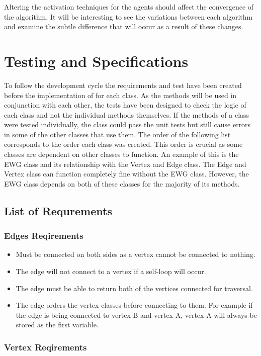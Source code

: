 \documentclass{AISB2008}
\begin{document}
{Altering the activation techniques for the agents should affect the convergence of the algorithm. It will be interesting to see the variations between each algorithm and examine the subtle difference that will occur as a result of these changes.


\section{Testing and Specifications}
To follow the development cycle the requirements and test have been created before the implementation of for each class. As the methods will be used in conjunction with each other, the tests have been designed to check the logic of each class and not the individual methods themselves. If the methods of a class were tested individually, the class could pass the unit tests but still cause errors in some of the other classes that use them.
The order of the following list corresponds to the order each class was created. This order is crucial as some classes are dependent on other classes to function. An example of this is the EWG class and its relationship with the Vertex and Edge class. The Edge and Vertex class can function completely fine without the EWG class. However, the EWG class depends on both of these classes for the majority of its methods.

\subsection{List of Requrements}

\subsubsection{Edges Reqirements}

\begin{itemize}
\item Must be connected on both sides as a vertex cannot be connected to nothing.
\item The edge will not connect to a vertex if a self-loop will occur.
\item The edge must be able to return both of the vertices connected for traversal.
\item The edge orders the vertex classes before connecting to them. For example if the edge is being connected to vertex B and vertex A, vertex A will always be stored as the first variable.
\end{itemize}


\subsubsection{Vertex Reqirements}

}
\end{document}
